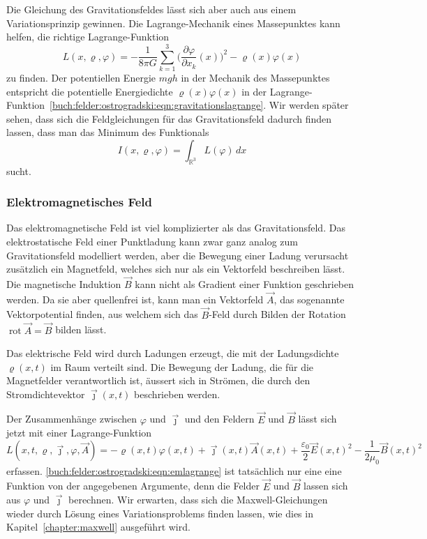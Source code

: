 Die Gleichung des Gravitationsfeldes lässt sich aber auch aus einem
Variationsprinzip gewinnen.
Die Lagrange-Mechanik eines Massepunktes kann helfen, die richtige
Lagrange-Funktion
\begin{equation}
L(x,\varrho,\varphi)
=
-\frac{1}{8\pi G}
\sum_{k=1}^3
\biggl(
\frac{\partial \varphi}{\partial x_k}(x)
\biggr)^2
-
\varrho(x)\varphi(x)
\label{buch:felder:ostrogradski:eqn:gravitationslagrange}
\end{equation}
zu finden.
Der potentiellen Energie $mgh$ in der Mechanik des Massepunktes
entspricht die potentielle Energiedichte $\varrho(x)\varphi(x)$
in der
Lagrange-Funktion~\eqref{buch:felder:ostrogradski:eqn:gravitationslagrange}.
Wir werden später sehen, dass sich die Feldgleichungen für das
Gravitationsfeld dadurch finden lassen, dass man das Minimum des
Funktionals
\[
I(x,\varrho,\varphi)
=
\int_{\mathbb{R}^3} L(\varphi)
\,dx
\]
sucht.

%
%
\subsubsection{Elektromagnetisches Feld}
Das elektromagnetische Feld ist viel komplizierter als das Gravitationsfeld.
Das elektrostatische Feld einer Punktladung kann zwar ganz analog zum
Gravitationsfeld modelliert werden, aber die Bewegung einer Ladung
verursacht zusätzlich ein Magnetfeld, welches sich nur als ein
Vektorfeld beschreiben lässt.
Die magnetische Induktion $\vec{B}$ kann nicht als Gradient einer Funktion
geschrieben werden.
Da sie aber quellenfrei ist, kann man ein Vektorfeld $\vec{A}$,
das sogenannte Vektorpotential finden, aus welchem sich das $\vec{B}$-Feld
durch Bilden der Rotation $\operatorname{rot}\vec{A}=\vec{B}$ bilden
lässt.

Das elektrische Feld wird durch Ladungen erzeugt, die mit der
Ladungsdichte $\varrho(x,t)$ im Raum verteilt sind.
Die Bewegung der Ladung, die für die Magnetfelder verantwortlich ist,
äussert sich in Strömen, die durch den Stromdichtevektor $\vec{\jmath}(x,t)$
beschrieben werden.

Der Zusammenhänge zwischen $\varphi$ und $\vec{\jmath}$ und den Feldern
$\vec{E}$ und $\vec{B}$ lässt sich jetzt mit einer Lagrange-Funktion
\begin{equation}
L(x,t,\varrho,\vec{\jmath},\varphi,\vec{A})
=
-\varrho(x,t) \varphi(x,t)
+
\vec{\jmath}(x,t)\vec{A}(x,t)
+
\frac{\varepsilon_0}{2}\vec{E}(x,t)^2
-
\frac{1}{2\mu_0}\vec{B}(x,t)^2
\label{buch:felder:ostrogradski:eqn:emlagrange}
\end{equation}
erfassen.
\eqref{buch:felder:ostrogradski:eqn:emlagrange} ist tatsächlich nur
eine eine Funktion von der angegebenen Argumente, denn die Felder
$\vec{E}$ und $\vec{B}$ lassen sich aus $\varphi$ und $\vec{\jmath}$ 
berechnen.
Wir erwarten, dass sich die Maxwell-Gleichungen wieder durch
Lösung eines Variationsproblems finden lassen, wie dies in
Kapitel~\ref{chapter:maxwell} ausgeführt wird.

